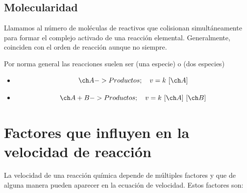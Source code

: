 \subsection{Molecularidad}\label{subsec:molecularidad}

Llamamos  al número de moléculas de reactivos que colisionan simultáneamente para formar el complejo activado de una reacción elemental.
Generalmente, coinciden con el orden de reacción aunque no siempre.

Por norma general las reacciones suelen ser  (una especie) o  (dos especies)

\begin{itemize}
    \item {}
    \begin{equation*}
        \formula{A -> Productos};\quad v= k\ \conc{A}
    \end{equation*}
    \item {}
    \begin{equation*}
        \formula{A + B -> Productos};\quad v= k\ \conc{A}\ \conc{B}
    \end{equation*}
\end{itemize}


\section{Factores que influyen en la velocidad de reacción}\label{sec:factores-que-influyen-en-la-velocidad-de-reaccion}

La velocidad de una reacción química depende de múltiples factores y que de alguna manera pueden aparecer en la ecuación de velocidad.
Estos factores son:

